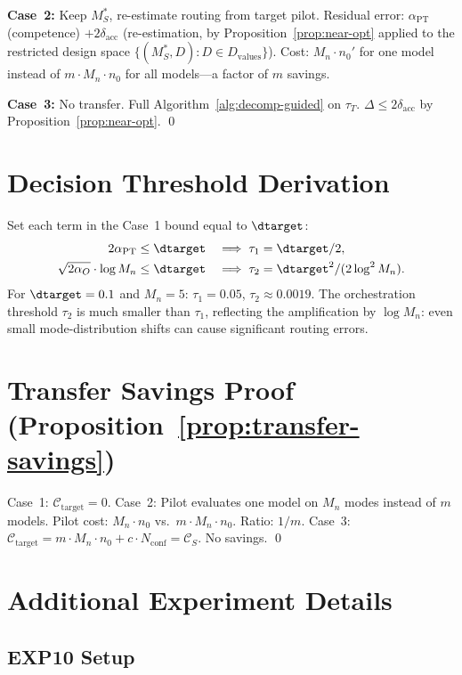\documentclass[11pt]{article}
\newcommand{\Mn}{M_n}
\newcommand{\dacc}{\delta_{\mathrm{acc}}}
\begin{document}
\textbf{Case~2:}
Keep $M_S^*$, re-estimate routing from target pilot.
Residual error: $\alpha_{\mathrm{PT}}$ (competence) $+ 2\dacc$
(re-estimation, by Proposition~\ref{prop:near-opt} applied to the
restricted design space $\{(M_S^*, D) : D \in D_{\mathrm{values}}\}$).
Cost: $\Mn \cdot n_0'$ for one model instead of $m \cdot \Mn \cdot n_0$
for all models---a factor of $m$ savings.

\textbf{Case~3:}
No transfer. Full Algorithm~\ref{alg:decomp-guided} on $\tau_T$.
$\Delta \le 2\dacc$ by Proposition~\ref{prop:near-opt}. \qed

\section{Decision Threshold Derivation}
\label{app:thresholds}

Set each term in the Case~1 bound equal to $\dtarget$:
\begin{align}
  2\alpha_{\mathrm{PT}} &\le \dtarget
    &\implies \tau_1 &= \dtarget/2, \\
  \sqrt{2\alpha_O}\cdot\log\Mn &\le \dtarget
    &\implies \tau_2 &= \dtarget^2/(2\log^2\Mn).
\end{align}
For $\dtarget = 0.1$ and $\Mn = 5$:
$\tau_1 = 0.05$, $\tau_2 \approx 0.0019$.
The orchestration threshold $\tau_2$ is much smaller than $\tau_1$,
reflecting the amplification by $\log\Mn$: even small mode-distribution
shifts can cause significant routing errors.

\section{Transfer Savings Proof (Proposition~\ref{prop:transfer-savings})}
\label{app:transfer-savings}

Case~1: $\mathcal{C}_{\mathrm{target}} = 0$.
Case~2: Pilot evaluates one model on $\Mn$ modes instead of $m$ models.
Pilot cost: $\Mn \cdot n_0$ vs.\ $m \cdot \Mn \cdot n_0$.
Ratio: $1/m$.
Case~3: $\mathcal{C}_{\mathrm{target}} = m \cdot \Mn \cdot n_0 +
c \cdot N_{\mathrm{conf}} = \mathcal{C}_S$. No savings. \qed

\section{Additional Experiment Details}
\label{app:experiments}

\subsection{EXP10 Setup}
\end{document}
